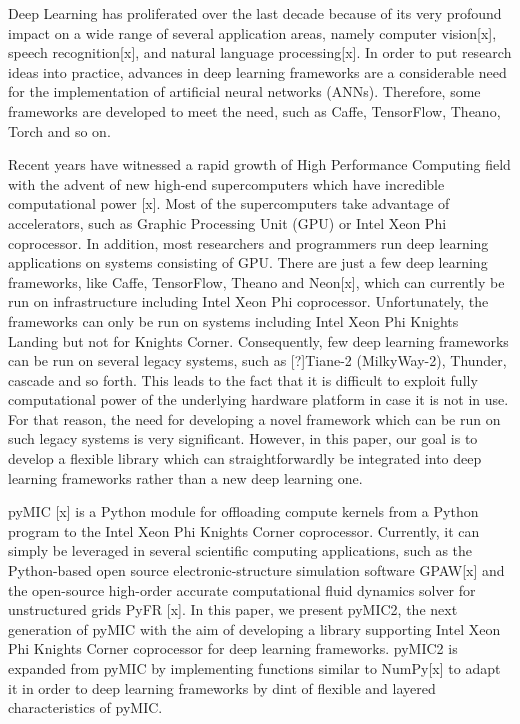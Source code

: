 Deep Learning has proliferated over the last decade because of its very profound impact on a wide range of several application areas, namely computer vision[x], speech recognition[x], and natural language processing[x]. In order to put research ideas into practice, advances in deep learning frameworks are a considerable need for the implementation of artificial neural networks (ANNs). Therefore, some frameworks are developed to meet the need, such as Caffe, TensorFlow, Theano, Torch and so on. 

Recent years have witnessed a rapid growth of High Performance Computing field with the advent of new high-end supercomputers which have incredible computational power [x]. Most of the supercomputers take advantage of accelerators, such as Graphic Processing Unit (GPU) or Intel Xeon Phi coprocessor. In addition, most researchers and programmers run deep learning applications on systems consisting of GPU. There are just a few deep learning frameworks, like Caffe, TensorFlow, Theano and Neon[x], which can currently be run on infrastructure including Intel Xeon Phi coprocessor. Unfortunately, the frameworks can only be run on systems including Intel Xeon Phi Knights Landing but not for Knights Corner. Consequently, few deep learning frameworks can be run on several legacy systems, such as [?]Tiane-2 (MilkyWay-2), Thunder, cascade and so forth. This leads to the fact that it is difficult to exploit fully computational power of the underlying hardware platform in case it is not in use. For that reason, the need for developing a novel framework which can be run on such legacy systems is very significant. However, in this paper, our goal is to develop a flexible library which can straightforwardly be integrated into deep learning frameworks rather than a new deep learning one.

pyMIC [x] is a Python module for offloading compute kernels from a Python program to the Intel Xeon Phi Knights Corner coprocessor. Currently, it can simply be leveraged in several scientific computing applications, such as the Python-based open source electronic-structure simulation software GPAW[x] and the open-source high-order accurate computational fluid dynamics solver for unstructured grids PyFR [x]. In this paper, we present pyMIC2, the next generation of pyMIC with the aim of developing a library supporting Intel Xeon Phi Knights Corner coprocessor for deep learning frameworks. pyMIC2 is expanded from pyMIC by implementing functions similar to NumPy[x] to adapt it in order to deep learning frameworks by dint of flexible and layered characteristics of pyMIC. 

